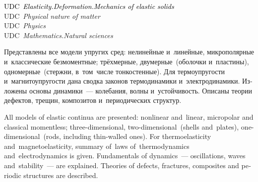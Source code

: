\begin{minipage}[b]{0.92\linewidth}
{\begin{otherlanguage}{russian}
\end{otherlanguage}

\vspace{\baselineskip}

\begin{otherlanguage}{english}

{\footnotesize%
\textcolor{black}{UDC~\emph{Elasticity.\:Deformation.\:Mechanics of elastic solids}}\\
\textcolor{black!50}{UDC~\emph{Physical nature of matter}}\\
\textcolor{black!40}{UDC~\emph{Physics}}\\
\textcolor{black!30}{UDC~\emph{Mathematics.\:Natural sciences}}%
\par}

\end{otherlanguage}

\vspace{0.25\paperheight}

\begin{otherlanguage}{russian}

Представлены все модели упругих сред: нелинейные и~линейные, микрополярные и~классические безмоментные; трёх\-мерные, дву\-мерные~(оболочки и~пластины), одно\-мерные~(стержни, в~том~числе тонко\-стен\-ные). Для термо\-упругости и~магнито\-упругости дана сводка законов термо\-динамики и~электро\-динамики. Изложены основы динамики~--- колебания, волны и~устойчивость. Описаны теории дефектов, трещин, композитов и~периодических структур.

\end{otherlanguage}

\vspace{1.2\baselineskip}

\begin{otherlanguage}{english}

All models of elastic continua are presented: nonlinear and~\hbox{linear}, micropolar and classical momentless; three-di\-men\-sion\-al, two-di\-men\-sion\-al~(shells and~plates), one-di\-men\-sion\-al~(rods, including thin\hbox{-}walled ones). For thermo\-elasticity and~magneto\-elasticity, summary of~laws of~thermo\-dynamics and~electro\-dynamics is given. Fundamentals of dynamics~--- oscillations, waves and~stability~--- are explained. Theories of defects, fractures, composites and periodic structures are described.


\end{otherlanguage}

}
\end{minipage}

\thispagestyle{empty}

\newpage
